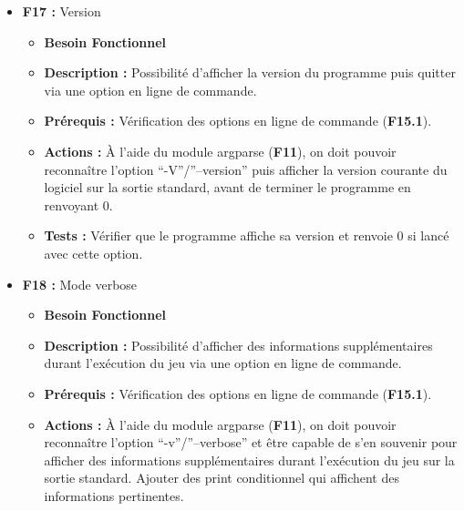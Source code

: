 \documentclass{article}
\begin{document}
\begin{itemize}
\begin{itemize}
        \item \textbf{Prérequis :} Vérification des options en ligne de commande (\textbf{F15.1}).
        \item \textbf{Actions :} À l’aide du module argparse (\textbf{F11}), on doit pouvoir reconnaître l’option “-h”/”--help” puis afficher une description du programme et les différentes options disponibles sur la sortie standard (\textbf{F17, F18, F19, F20}), avant de terminer le programme en renvoyant 0.
        \item \textbf{Tests :} Vérifier que le programme affiche bien l’aide et renvoie 0 si lancé avec cette option.
    \end{itemize}
\bigskip
    \item \textbf{F17 :} Version
    \begin{itemize}
        \item \textbf{Besoin Fonctionnel}
        \item \textbf{Description :} Possibilité d’afficher la version du programme puis quitter via une option en ligne de commande.
        \item \textbf{Prérequis :} Vérification des options en ligne de commande (\textbf{F15.1}).
        \item \textbf{Actions :} À l’aide du module argparse (\textbf{F11}), on doit pouvoir reconnaître l’option “-V”/”--version” puis afficher la version courante du logiciel sur la sortie standard, avant de terminer le programme en renvoyant 0.
        \item \textbf{Tests :} Vérifier que le programme affiche sa version et renvoie 0 si lancé avec cette option.
    \end{itemize}
\bigskip    
    \item \textbf{F18 :} Mode verbose
    \begin{itemize}
        \item \textbf{Besoin Fonctionnel}
        \item \textbf{Description :} Possibilité d’afficher des informations supplémentaires durant l'exécution du jeu via une option en ligne de commande.
        \item \textbf{Prérequis :} Vérification des options en ligne de commande (\textbf{F15.1}).
        \item \textbf{Actions :} À l’aide du module argparse (\textbf{F11}), on doit pouvoir reconnaître l’option “-v”/”--verbose” et être capable de s’en souvenir pour afficher des informations supplémentaires durant l'exécution du jeu sur la sortie standard. Ajouter des print conditionnel qui affichent des informations pertinentes.

\end{itemize}
\end{itemize}
\end{document}
